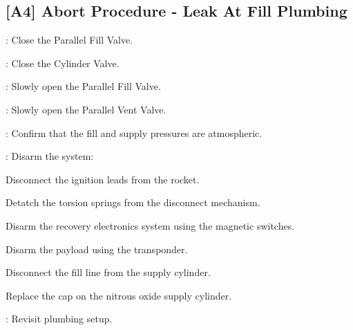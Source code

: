 \subsection{[A4] Abort Procedure - Leak At Fill Plumbing}
\begin{checklist}
    \item \primary{}: Close the Parallel Fill Valve.
    \item \primary{}: Close the Cylinder Valve.
    \item \primary{}: Slowly open the Parallel Fill Valve.
    \item \primary{}: Slowly open the Parallel Vent Valve.
    \item \control{}: Confirm that the fill and supply pressures are atmospheric.
    \item \primary{}: Disarm the system:
        \begin{checklist}    
            \item Disconnect the ignition leads from the rocket.
            \item Detatch the torsion springs from the disconnect mechanism.
            \item Disarm the recovery electronics system using the magnetic switches.
            \item Disarm the payload using the transponder.
            \item Disconnect the fill line from the supply cylinder.
            \item Replace the cap on the nitrous oxide supply cylinder.
        \end{checklist}
    \item \ops{}: Revisit plumbing setup.
\end{checklist}
\setcounter{checklistnum}{0}

